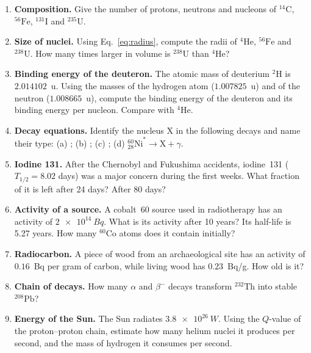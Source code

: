 \documentclass[11pt,a4paper]{article}
\newcommand{\nuc}[3]{\ensuremath{{}^{#1}_{#2}\mathrm{#3}}}   %
\newcommand{\iso}[2]{\ensuremath{{}^{#1}\mathrm{#2}}}         %
\begin{document}
\begin{enumerate}[label=\textbf{\arabic*.}]
  \item \textbf{Composition.} Give the number of protons, neutrons and nucleons of \iso{14}{C}, \iso{56}{Fe}, \iso{131}{I} and \iso{235}{U}.

  \item \textbf{Size of nuclei.} Using Eq.~\eqref{eq:radius}, compute the radii of \iso{4}{He}, \iso{56}{Fe} and \iso{238}{U}. How many times larger in volume is \iso{238}{U} than \iso{4}{He}?

  \item \textbf{Binding energy of the deuteron.} The atomic mass of deuterium \iso{2}{H} is $2.014102$~u. Using the masses of the hydrogen atom ($1.007825$~u) and of the neutron ($1.008665$~u), compute the binding energy of the deuteron and its binding energy per nucleon. Compare with \iso{4}{He}.

  \item \textbf{Decay equations.} Identify the nucleus X in the following decays and name their type:
  (a) ;
  (b) ;
  (c) ;
  (d) $\nuc{60}{28}{Ni}^* \to \mathrm{X} + \gamma$.

  \item \textbf{Iodine 131.} After the Chernobyl and Fukushima accidents, iodine~131 ($T_{1/2} = 8.02$ days) was a major concern during the first weeks. What fraction of it is left after 24 days? After 80 days?

  \item \textbf{Activity of a source.} A cobalt~60 source used in radiotherapy has an activity of $\SI{2e14}{Bq}$. What is its activity after 10 years? Its half-life is 5.27 years. How many \iso{60}{Co} atoms does it contain initially?

  \item \textbf{Radiocarbon.} A piece of wood from an archaeological site has an activity of $0.16$~Bq per gram of carbon, while living wood has $0.23$~Bq/g. How old is it?

  \item \textbf{Chain of decays.} How many $\alpha$ and $\beta^-$ decays transform \iso{232}{Th} into stable \iso{208}{Pb}?

  \item \textbf{Energy of the Sun.} The Sun radiates $\SI{3.8e26}{W}$. Using the $Q$-value of the proton--proton chain, estimate how many helium nuclei it produces per second, and the mass of hydrogen it consumes per second.


\end{enumerate}
\end{document}

